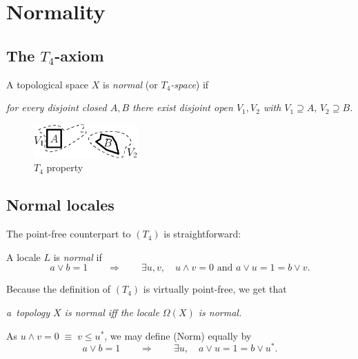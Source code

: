 \chapter{Normality}

\section{The $T_4$-axiom}

\begin{framed}
  \begin{df}[$T_4$]
    A topological space $X$ is \emph{normal\/} (or \emph{$T_4$-space\/}) if
    \begin{center} \it
      for every disjoint closed $A, B$ there exist disjoint open $V_1, V_2$ with
      $V_1\supseteq A, \, V_2\supseteq B$.
    \end{center}
  \end{df}
\end{framed}

\begin{figure}[h]
  \centering
  \includegraphics[height=13mm]{../img/t4.eps}
  \caption{$T_4$ property}
\end{figure}

\section{Normal locales}

The point-free counterpart to $(T_4)$ is straightforward:

\begin{framed}
  \begin{df}[Norm]
    A locale $L$ is \emph{normal\/} if
    \[
      a \vee b = 1 \qquad \Rightarrow \qquad \exists u, v, \quad u \wedge v =
      0 \text{ and } a \vee u = 1 = b \vee v.
    \]
  \end{df}
\end{framed}

Because the definition of $(T_4)$ is virtually point-free, we get that
\begin{center}
  \emph{a~topology $X$ is normal iff the locale $\Omega(X)$ is normal.\/}
\end{center}

\begin{rem}
  As $u \wedge v = 0 \; \equiv \; v \le u^*$, we may define (Norm) equally by
  \[
    a \vee b = 1 \qquad \Rightarrow \qquad \exists u, \quad a \vee u = 1 = b
    \vee u^*.
  \]
\end{rem}

